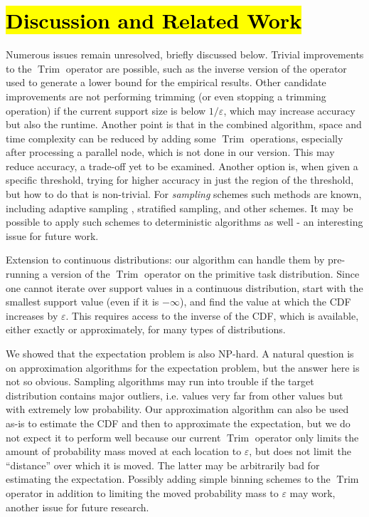 \documentclass{article}
\DeclareMathOperator{\Trim}{Trim}
\begin{document}
\section{\hl{Discussion and Related Work}}\label{sec:discussion}

Numerous issues remain unresolved, briefly discussed below.
Trivial improvements to the $\Trim$ operator are possible, such as the inverse version of the operator used to
generate a lower bound for the empirical results. Other candidate improvements are not performing trimming
(or even stopping a trimming operation) if the current support size is below $1/\varepsilon$, which may increase accuracy but also
the runtime. Another point is that in the combined algorithm, space and time complexity can be reduced by adding some $\Trim$ operations,
especially after processing a parallel node, which is not done in our version. This may reduce accuracy, 
a trade-off yet to be examined.
Another option is, when given a specific threshold, trying for higher accuracy in just the region of the
threshold, but how to do that is non-trivial. For {\em sampling} schemes such methods are known, including adaptive 
sampling \cite{bucher1988adaptive,lipton1990practical},
stratified sampling, and other schemes.
It may be possible to apply such schemes to deterministic algorithms as well - an interesting issue for future work.

Extension to continuous distributions: our algorithm can handle them by
pre-running a version of the $\Trim$ operator on the primitive task distribution. Since one cannot iterate over support values
in a continuous distribution, start with the smallest support value (even if it is $- \infty$), and find the value at which the CDF
increases by $\varepsilon$. This requires access to the inverse of the CDF, which is available, either exactly or approximately,
for many types of distributions. %

We showed that the expectation problem is also NP-hard.
A natural question is on approximation algorithms for the expectation problem, but the answer here is not so obvious.
Sampling algorithms may run into trouble if the target distribution contains major outliers, i.e. values very far from
other values but with extremely low probability. Our approximation algorithm can also be used as-is to estimate
the CDF and then to approximate the expectation, but we do not expect it to perform well because our current $\Trim$
operator only limits the amount of probability mass moved at each location to $\varepsilon$, but does not limit the
``distance'' over which it is moved. The latter may be arbitrarily bad for estimating the expectation.
Possibly adding simple binning schemes to the $\Trim$ operator in addition to limiting the moved probability mass to $\varepsilon$
may work, another issue for future research. 
\end{document}
